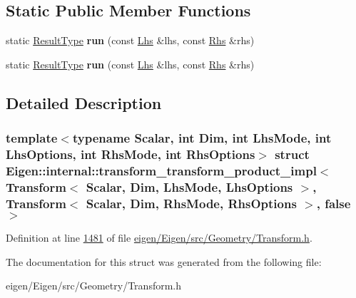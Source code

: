 \subsection*{Static Public Member Functions}
\begin{DoxyCompactItemize}
\item 
\mbox{\label{struct_eigen_1_1internal_1_1transform__transform__product__impl_3_01_transform_3_01_scalar_00_01fe1fb77c9f6edc527bf418dd10ef65b9_ad90db0bdb34cb2f6631ef120dc667c23}} 
static \hyperlink{group___geometry___module_class_eigen_1_1_transform}{Result\+Type} {\bfseries run} (const \hyperlink{group___geometry___module_class_eigen_1_1_transform}{Lhs} \&lhs, const \hyperlink{group___geometry___module_class_eigen_1_1_transform}{Rhs} \&rhs)
\item 
\mbox{\label{struct_eigen_1_1internal_1_1transform__transform__product__impl_3_01_transform_3_01_scalar_00_01fe1fb77c9f6edc527bf418dd10ef65b9_ad90db0bdb34cb2f6631ef120dc667c23}} 
static \hyperlink{group___geometry___module_class_eigen_1_1_transform}{Result\+Type} {\bfseries run} (const \hyperlink{group___geometry___module_class_eigen_1_1_transform}{Lhs} \&lhs, const \hyperlink{group___geometry___module_class_eigen_1_1_transform}{Rhs} \&rhs)
\end{DoxyCompactItemize}


\subsection{Detailed Description}
\subsubsection*{template$<$typename Scalar, int Dim, int Lhs\+Mode, int Lhs\+Options, int Rhs\+Mode, int Rhs\+Options$>$\newline
struct Eigen\+::internal\+::transform\+\_\+transform\+\_\+product\+\_\+impl$<$ Transform$<$ Scalar, Dim, Lhs\+Mode, Lhs\+Options $>$, Transform$<$ Scalar, Dim, Rhs\+Mode, Rhs\+Options $>$, false $>$}



Definition at line \hyperlink{eigen_2_eigen_2src_2_geometry_2_transform_8h_source_l01481}{1481} of file \hyperlink{eigen_2_eigen_2src_2_geometry_2_transform_8h_source}{eigen/\+Eigen/src/\+Geometry/\+Transform.\+h}.



The documentation for this struct was generated from the following file\+:\begin{DoxyCompactItemize}
\item 
eigen/\+Eigen/src/\+Geometry/\+Transform.\+h\end{DoxyCompactItemize}
